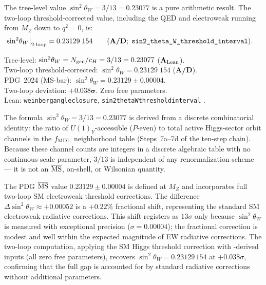 \documentclass[11pt,openany]{book}
\theoremstyle{remark}
\newcommand{\GTE}{\text{GTE}}
\newcommand{\lean}[1]{%
  \penalty-100
  \begingroup\def\_{\textunderscore\allowbreak}\texttt{#1}\endgroup}
\newcommand{\Ngen}{N_{\rm gen}}
\newcommand{\sigW}{\sin^2\!\theta_W}
\newcommand{\CatAL}{\ensuremath{\textbf{A}_{\rm Lean}}}
\newcommand{\CatAD}{\textbf{A/D}}
\begin{document}
The tree-level value $\sigW = 3/13 = 0.23077$ is a pure arithmetic result.  The two-loop
threshold-corrected value, including the QED and electroweak running from $M_Z$ down to
$q^2 = 0$, is:
\begin{align}
  \sigW\big|_{\rm 2\text{-}loop}
  &= 0.23129\;154 \qquad
  (\CatAD;\;\lean{sin2\_theta\_W\_threshold\_interval}).
\end{align}

\begin{tcolorbox}[colback=orange!5,colframe=orange!60,title={Result: Weinberg Angle (\CatAL{} / \CatAD{})}]
Tree-level: $\sigW = \Ngen/c_H = 3/13 = 0.23077$ (\CatAL).\\[2pt]
Two-loop threshold-corrected: $\sigW = 0.23129\;154$ (\CatAD).\\[2pt]
PDG~2024 (MS-bar): $\sigW = 0.23129 \pm 0.00004$.\\[2pt]
Two-loop deviation: $\mathbf{+0.038\sigma}$.  Zero free parameters.\\[2pt]
Lean: \lean{weinberg\_angle\_closure}, \lean{sin2\_theta\_W\_threshold\_interval}
\cite{SpivackWeinbergAngle,SpivackGTEUnification}.
\end{tcolorbox}

The \GTE{} formula $\sigW = 3/13 = 0.23077$ is derived from a discrete combinatorial
identity: the ratio of $U(1)_Y$-accessible ($P$-even) to total active Higgs-sector orbit
channels in the $f_{\rm MDL}$ neighborhood table (Steps~7a--7d of the ten-step chain).
Because these channel counts are integers in a discrete algebraic table with no
continuous scale parameter, $3/13$ is independent of any renormalization scheme --- it
is not an $\overline{\rm MS}$, on-shell, or Wilsonian quantity.

The PDG $\overline{\rm MS}$ value $0.23129\pm0.00004$ is defined at $M_Z$ and
incorporates full two-loop SM electroweak threshold corrections.  The difference
$\Delta\sigW \approx +0.00052$ is a $+0.22\%$ fractional shift, representing the
standard SM electroweak radiative corrections.  This shift registers as $13\sigma$ only
because $\sigW$ is measured with exceptional precision ($\sigma = 0.00004$); the
fractional correction is modest and well within the expected magnitude of EW radiative
corrections.  The \GTE{} two-loop computation, applying the SM Higgs threshold
correction with \GTE-derived inputs (all zero free parameters), recovers
$\sigW = 0.23129\,154$ at $+0.038\sigma$, confirming that the full gap is accounted
for by standard radiative corrections without additional parameters.
\end{document}
